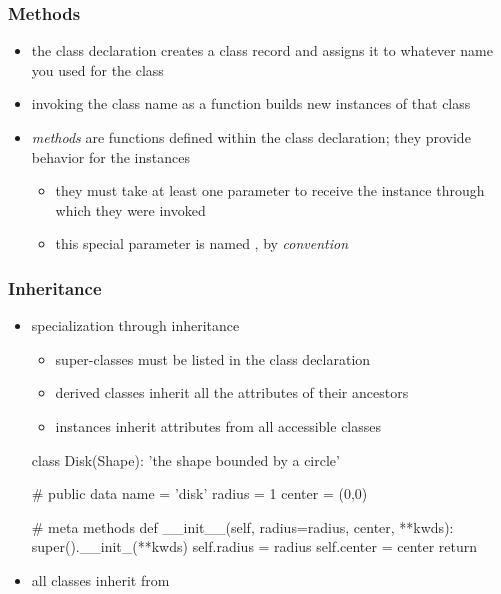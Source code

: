 \begin{frame}[fragile]
%
  \frametitle{Methods}
%
  \begin{itemize}
%
  \item the class declaration creates a class record and assigns it to whatever name you used
    for the class
%
  \item invoking the class name as a function builds new instances of that class
%
  \item \emph{methods} are functions defined within the class declaration; they provide
    behavior for the instances
    \begin{itemize}
    \item they must take at least one parameter to receive the instance through which they were
      invoked
    \item this special parameter is named , by \emph{convention}
    \end{itemize}
%
  \end{itemize}
%
\end{frame}

\begin{frame}[fragile]
%
  \frametitle{Inheritance}
%
  \begin{itemize}
%
  \item specialization through inheritance 
    \begin{itemize}
    \item super-classes must be listed in the class declaration
    \item derived classes inherit all the attributes of their ancestors
    \item instances inherit attributes from all accessible classes
    \end{itemize}
%
    \begin{ipython}{}
      class Disk(Shape):
          'the shape bounded by a circle'

          # public data
          name = 'disk'
          radius = 1
          center = (0,0)

          # meta methods
          def __init__(self, radius=radius, center, **kwds):
              super().__init_(**kwds)
              self.radius = radius
              self.center = center
              return
    \end{ipython}
%
  \item all classes inherit from 
%
  \end{itemize}
%
\end{frame}

